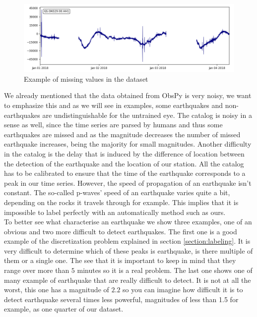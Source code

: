 \documentclass[10pt,conference,compsocconf]{IEEEtran}
\begin{document}
\begin{figure}[h]
  \centering
	\includegraphics[width=\columnwidth]{hole_example.png}
  \caption{Example of missing values in the dataset}
	\label{fig:10min-example}
\end{figure}

We already mentioned that the data obtained from ObsPy is very noisy, we want to emphasize this and as we will see in examples, some earthquakes and non-earthquakes are undistinguishable for the untrained eye. The catalog is noisy in a sense as well, since the time series are parsed by humans and thus some earthquakes are missed and as the magnitude decreases the number of missed earthquake increases, being the majority for small magnitudes. Another difficulty in the catalog is the delay that is induced by the difference of location between the detection of the earthquake and the location of our station. All the catalog has to be calibrated to ensure that the time of the earthquake corresponds to a peak in our time series. However, the speed of propagation of an earthquake isn't constant. The so-called p-waves' speed of an earthquake varies quite a bit, depending on the rocks it travels through for example. This implies that it is impossible to label perfectly with an automatically method such as ours.\\
To better see what characterise an earthquake we show three examples, one of an obvious and two more difficult to detect earthquakes. The first one is a good example of the discretization problem explained in section \ref{section:labeling}. It is very difficult to determine which of these peaks is earthquake, is there multiple of them or a single one. The see that it is important to keep in mind that they range over more than $5$ minutes so it is a real problem. The last one shows one of many example of earthquake that are really difficult to detect. It is not at all the worst, this one has a magnitude of $2.2$ so you can imagine how difficult it is to detect earthquake several times less powerful, magnitudes of less than 1.5 for example, as one quarter of our dataset.
\end{document}
